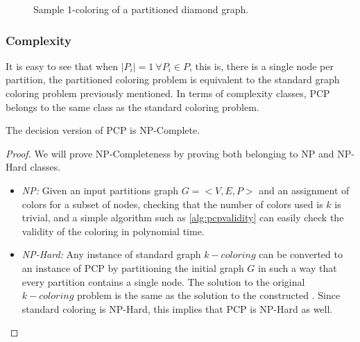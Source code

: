 \begin{figure}[h]
	\centering
\caption{Sample 1-coloring of a partitioned diamond graph.}
	\label{fig:samplepartitionedcoloring}
\end{figure}

\subsubsection*{Complexity}

It is easy to see that when $|P_i| = 1\ \forall P_i \in P$, this is, there is a single node per partition, the partitioned coloring problem is equivalent to the standard graph coloring problem previously mentioned. In terms of complexity classes, PCP belongs to the same class as the standard coloring problem.

\begin{theorem}
The decision version of PCP is NP-Complete.
\end{theorem}

\begin{proof}
We will prove NP-Completeness by proving both belonging to NP and NP-Hard classes.

\begin{itemize}
\item{\textit{NP:} Given an input partitions graph $G = <V,E,P>$ and an assignment of colors for a subset of nodes, checking that the number of colors used is $k$ is trivial, and a simple algorithm such as \ref{alg:pcpvalidity} can easily check the validity of the coloring in polynomial time.}
\item{\textit{NP-Hard:} Any instance of standard graph $k-coloring$ can be converted to an instance of PCP by partitioning the initial graph $G$ in such a way that every partition contains a single node. The solution to the original $k-coloring$ problem is the same as the solution to the constructed \PCP{}. Since standard coloring is NP-Hard, this implies that PCP is NP-Hard as well.}
\end{itemize}

\end{proof}

